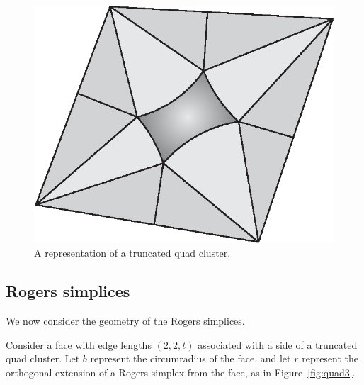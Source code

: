 \begin{figure}
\begin{center}
\includegraphics{PS/planar2}
\end{center}
\caption{A representation of a truncated quad cluster.}
\label{fig:quad2}
\end{figure}

\subsection{Rogers simplices}
We now consider the geometry of the Rogers simplices.

Consider a face with edge lengths $(2,2,t)$
associated with a side of
a truncated quad cluster.
Let $b$ represent the circumradius of the
face, and let $r$ represent the orthogonal extension of a
Rogers simplex from the face, as in Figure~\ref{fig:quad3}.

